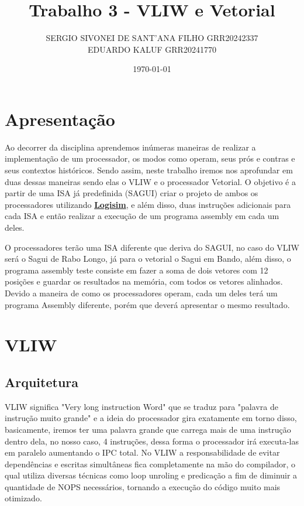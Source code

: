 \documentclass{article}
\title{Trabalho 3 - VLIW e Vetorial}
\author{SERGIO SIVONEI DE SANT'ANA FILHO GRR20242337\\EDUARDO KALUF GRR20241770}
\date{\today}
\begin{document}
    \maketitle
    
    \section{Apresentação}
    
    Ao decorrer da disciplina aprendemos inúmeras maneiras de realizar a implementação de um processador, os modos como operam, seus prós e contras e seus contextos históricos. Sendo assim, neste trabalho iremos nos aprofundar em duas dessas maneiras sendo elas o VLIW e o processador Vetorial. O objetivo é a partir de uma ISA já predefinida (SAGUI) criar o projeto de ambos os processadores utilizando \href{https://github.com/logisim-evolution/logisim-evolution}{\textbf{Logisim}}, e além disso, duas instruções adicionais para cada ISA e então realizar a execução de um programa assembly em cada um deles.

    O processadores terão uma ISA diferente que deriva do SAGUI, no caso do VLIW será o Sagui de Rabo Longo, já para o vetorial o Sagui em Bando, além disso, o programa assembly teste consiste em fazer a soma de dois vetores com 12 posições e guardar os resultados na memória, com todos os vetores alinhados.
    Devido a maneira de como os processadores operam, cada um deles terá um programa Assembly diferente, porém que deverá apresentar o mesmo resultado.

    \section{VLIW}
    
    \subsection{Arquitetura}

    VLIW significa "Very long instruction Word" que se traduz para "palavra de instrução muito grande" e a ideia do processador gira exatamente em torno disso, basicamente, iremos ter uma palavra grande que carrega mais de uma instrução dentro dela, no nosso caso, 4 instruções, dessa forma o processador irá executa-las em paralelo aumentando o IPC total.
    No VLIW a responsabilidade de evitar dependências e escritas simultâneas fica completamente na mão do compilador, o qual utiliza diversas técnicas como loop unroling e predicação a fim de diminuir a quantidade de NOPS necessários, tornando a execução do código muito mais otimizado.
\end{document}
